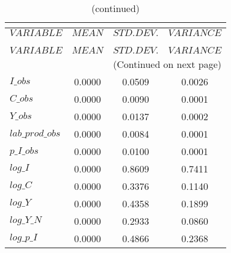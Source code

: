  
\begin{center}
\begin{longtable}{lccc} 
\caption{THEORETICAL MOMENTS}\\
 \label{Table:th_moments}\\
\toprule 
$VARIABLE        $	 & 	 $         MEAN$	 & 	 $    STD. DEV.$	 & 	 $     VARIANCE$\\
\midrule \endfirsthead 
\caption{(continued)}\\
 \toprule \\ 
$VARIABLE        $	 & 	 $         MEAN$	 & 	 $    STD. DEV.$	 & 	 $     VARIANCE$\\
\midrule \endhead 
\midrule \multicolumn{4}{r}{(Continued on next page)} \\ \bottomrule \endfoot 
\bottomrule \endlastfoot 
$I\_obs          $	 & 	       0.0000	 & 	       0.0509	 & 	       0.0026 \\ 
$C\_obs          $	 & 	       0.0000	 & 	       0.0090	 & 	       0.0001 \\ 
$Y\_obs          $	 & 	       0.0000	 & 	       0.0137	 & 	       0.0002 \\ 
$lab\_prod\_obs  $	 & 	       0.0000	 & 	       0.0084	 & 	       0.0001 \\ 
$p\_I\_obs       $	 & 	       0.0000	 & 	       0.0100	 & 	       0.0001 \\ 
$log\_I          $	 & 	       0.0000	 & 	       0.8609	 & 	       0.7411 \\ 
$log\_C          $	 & 	       0.0000	 & 	       0.3376	 & 	       0.1140 \\ 
$log\_Y          $	 & 	       0.0000	 & 	       0.4358	 & 	       0.1899 \\ 
$log\_Y\_N       $	 & 	       0.0000	 & 	       0.2933	 & 	       0.0860 \\ 
$log\_p\_I       $	 & 	       0.0000	 & 	       0.4866	 & 	       0.2368 \\ 
\end{longtable}
 \end{center}
